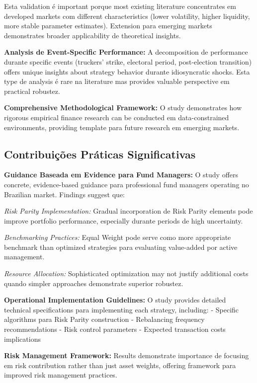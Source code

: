 Esta validation é important porque most existing literature concentrates em developed markets com different characteristics (lower volatility, higher liquidity, more stable parameter estimates). Extension para emerging markets demonstrates broader applicability de theoretical insights.

\textbf{Analysis de Event-Specific Performance:} A decomposition de performance durante specific events (truckers' strike, electoral period, post-election transition) offers unique insights about strategy behavior durante idiosyncratic shocks. Esta type de analysis é rare na literature mas provides valuable perspective em practical robustez.

\textbf{Comprehensive Methodological Framework:} O study demonstrates how rigorous empirical finance research can be conducted em data-constrained environments, providing template para future research em emerging markets.

\subsection{Contribuições Práticas Significativas}

\textbf{Guidance Baseada em Evidence para Fund Managers:} O study offers concrete, evidence-based guidance para professional fund managers operating no Brazilian market. Findings suggest que:

\textit{Risk Parity Implementation:} Gradual incorporation de Risk Parity elements pode improve portfolio performance, especially durante periods de high uncertainty.

\textit{Benchmarking Practices:} Equal Weight pode serve como more appropriate benchmark than optimized strategies para evaluating value-added por active management.

\textit{Resource Allocation:} Sophisticated optimization may not justify additional costs quando simpler approaches demonstrate superior robustez.

\textbf{Operational Implementation Guidelines:} O study provides detailed technical specifications para implementing each strategy, including:
- Specific algorithms para Risk Parity construction
- Rebalancing frequency recommendations
- Risk control parameters
- Expected transaction costs implications

\textbf{Risk Management Framework:} Results demonstrate importance de focusing em risk contribution rather than just asset weights, offering framework para improved risk management practices.

